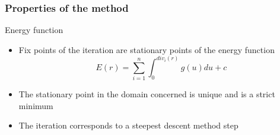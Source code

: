 \begin{frame}
\frametitle{Properties of the method}
\begin{block}{Energy function}
\begin{itemize}
\item Fix points of the iteration are stationary points of the energy function
$$E(r) =  \sum_{i=1}^n \int_0^{div_i(r)}g(u) du + c $$
\item The stationary point in the domain concerned is unique and is a strict minimum
\item The iteration corresponds to a steepest descent method step
\end{itemize}
\end{block}
\end{frame}